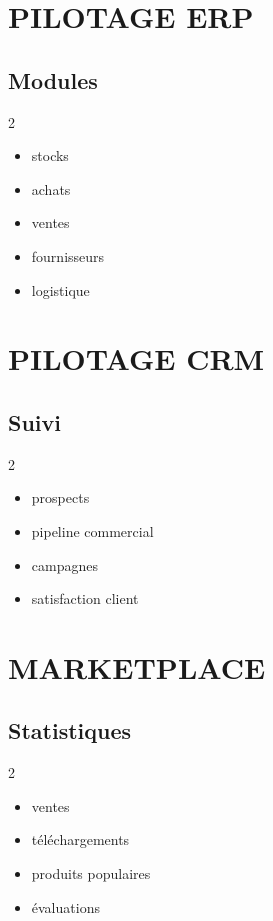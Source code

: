 \documentclass[12pt,a4paper,oneside]{book}
\begin{document}
\chapter{PILOTAGE ERP}

\section{Modules}
\begin{multicols}{2}
\begin{itemize}
\item stocks
\item achats
\item ventes
\item fournisseurs
\item logistique
\end{itemize}
\end{multicols}

\chapter{PILOTAGE CRM}

\section{Suivi}
\begin{multicols}{2}
\begin{itemize}
\item prospects
\item pipeline commercial
\item campagnes
\item satisfaction client
\end{itemize}
\end{multicols}

\chapter{MARKETPLACE}

\section{Statistiques}
\begin{multicols}{2}
\begin{itemize}
\item ventes
\item téléchargements
\item produits populaires
\item évaluations
\end{itemize}
\end{multicols}
\end{document}
